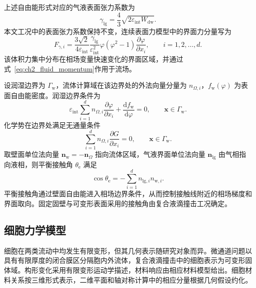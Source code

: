 上述自由能形式对应的气液表面张力系数为
\begin{equation}
\gamma_{\mathrm{lg}}
=
\frac{4}{3}
\sqrt{2\varepsilon_{\mathrm{int}}W_{\mathrm{dw}}}.
\label{eq:ch2_surface_tension_relation}
\end{equation}
本文工况中的表面张力系数保持不变，连续表面力模型中的界面力分量写为
\begin{equation}
F_{\gamma,i}
=
\frac{3\sqrt{2}}{4\varepsilon_{\mathrm{int}}}
\frac{\gamma_{\mathrm{lg}}}{\varepsilon_{\mathrm{int}}^2}
\varphi\left(\varphi^2-1\right)
\frac{\partial\varphi}{\partial x_i},
\qquad i=1,2,\ldots,d.
\label{eq:ch2_phase_surface_force}
\end{equation}
该体积力集中分布在相场变量快速变化的界面区域，并通过式~\eqref{eq:ch2_fluid_momentum}作用于流场。

设润湿边界为 $\Gamma_{\mathrm w}$，流体计算域在该边界处的外法向量分量为 $n_{\Omega,i}$，$f_{\mathrm w}(\varphi)$ 为表面自由能密度。润湿边界条件为
\begin{equation}
\varepsilon_{\mathrm{int}}
\sum_{i=1}^{d}
n_{\Omega,i}
\frac{\partial\varphi}{\partial x_i}
+
\frac{\mathrm df_{\mathrm w}}{\mathrm d\varphi}
=0,
\qquad
\boldsymbol{x}\in\Gamma_{\mathrm w}.
\label{eq:ch2_wetting_bc}
\end{equation}
化学势在边界处满足无通量条件
\begin{equation}
\sum_{i=1}^{d}
n_{\Omega,i}
\frac{\partial G}{\partial x_i}
=0,
\qquad
\boldsymbol{x}\in\Gamma_{\mathrm w}.
\label{eq:ch2_chemical_no_flux}
\end{equation}
取壁面单位法向量 $\boldsymbol{n}_{\mathrm w}=-\boldsymbol{n}_{\Omega}$ 指向流体区域，气液界面单位法向量 $\boldsymbol{n}_{\mathrm{lg}}$ 由气相指向液相，则平衡接触角 $\theta_{\mathrm e}$ 满足
\begin{equation}
\cos\theta_{\mathrm e}
=
-\sum_{i=1}^{d}
n_{\mathrm{lg},i}n_{\mathrm w,i}.
\label{eq:ch2_contact_angle_geometry}
\end{equation}
平衡接触角通过壁面自由能进入相场边界条件，从而控制接触线附近的相场梯度和界面取向。固定固壁与可变形表面采用的接触角由复合液滴撞击工况确定\cite{deGennes1985wetting,bonn2009wetting,snoeijer2013moving}。

\subsection{细胞力学模型}
\label{subsec:ch2_cell_mechanics}

细胞在两类流动中均发生有限变形，但其几何表示随研究对象而异。微通道问题以具有有限厚度的闭合膜区分隔胞内外流体，复合液滴撞击中的细胞表示为可变形固体域。构形变化采用有限变形运动学描述，材料响应由相应材料模型给出。细胞材料关系按三维形式表示，二维平面和轴对称计算中的相应分量根据几何假设约化。

